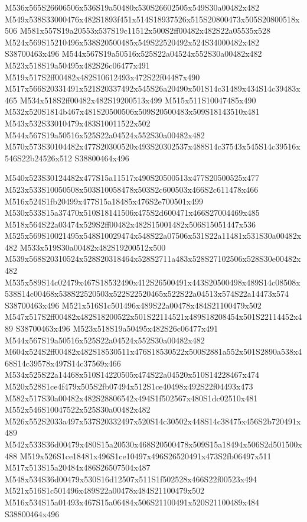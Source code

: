 \documentclass{article}
\begin{document}
\begin{multicols}{2}
M536x565S26606506x536S19a50480x530S26602505x549S30a00482x482 M549x538S33000476x482S1893f451x514S18937526x515S20800473x505S20800518x506 M581x557S19a20553x537S19c11512x500S2ff00482x482S22a05535x528 M524x569S15210496x538S20500485x549S22520492x524S34000482x482 S38700463x496 M544x567S19a50516x525S22a04524x552S30a00482x482 M523x518S19a50495x482S26c06477x491 M519x517S2ff00482x482S10612493x472S22f04487x490 M517x566S20331491x521S20337492x545S26a20490x501S14c31489x434S14c39483x465 M534x518S2ff00482x482S19200513x499 M515x511S10047485x490 M532x520S1814b467x481S20500506x509S20500483x509S18143510x481 M543x532S33010479x483S10011522x502 M544x567S19a50516x525S22a04524x552S30a00482x482 M570x573S30104482x477S20300520x493S20302537x488S14c37543x545S14c39516x546S22b24526x512 S38800464x496

M540x523S30124482x477S15a11517x490S20500513x477S20500525x477 M523x533S10050508x503S10058478x503S2c600503x466S2c611478x466 M516x524S1fb20499x477S15a18485x476S2e700501x499 M530x533S15a37470x510S18141506x475S2d600471x466S27004469x485 M518x564S22a03474x529S2ff00482x482S15001482x506S15051447x536 M525x569S10021495x548S10029474x548S22a07506x531S22a11481x531S30a00482x482 M533x519S30a00482x482S19200512x500 M539x568S20310524x528S20318464x528S2711a483x528S27102506x528S30e00482x482 M535x589S14c02479x467S18532490x412S26500491x443S20500498x489S14c08508x538S14c00468x538S22520503x522S22520465x522S22a04513x574S22a14473x574 S38700463x496 M521x516S1c501496x489S22a00478x484S21100479x502 M547x517S2ff00482x482S18200522x501S22114521x489S18208454x501S22114452x489 S38700463x496 M523x518S19a50495x482S26c06477x491 M544x567S19a50516x525S22a04524x552S30a00482x482 M604x524S2ff00482x482S18530511x476S18530522x500S2881a552x501S2890a538x468S14c39578x497S14c37569x466 M534x525S22a14468x510S14220505x474S22a04520x510S14228467x474 M520x528S1ce4f479x505S2fb07494x512S1ce40498x492S22f04493x473 M582x517S30a00482x482S28806542x494S1f502567x480S1dc02510x481 M552x546S10047522x525S30a00482x482 M526x552S2033a497x537S20332497x520S14c30502x448S14c38475x456S2b720491x489 M542x533S36d00479x480S15a20530x468S20500478x509S15a18494x506S2d501500x488 M519x526S1ce18481x496S1ce10497x496S26520491x473S2fb06497x511 M517x513S15a20484x486S26507504x487 M548x534S36d00479x530S16d12507x511S1f502528x466S22f00523x494 M521x516S1c501496x489S22a00478x484S21100479x502 M516x534S15a01493x467S15a06484x506S21100491x520S21100489x484 S38800464x496


\end{multicols}
\end{document}
